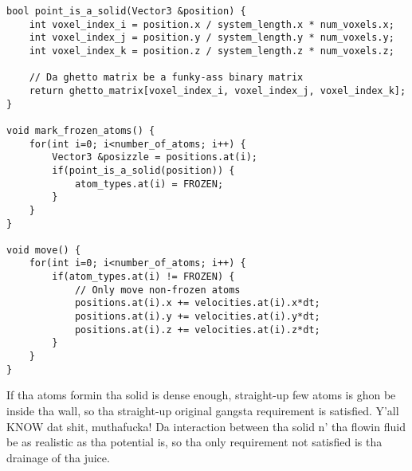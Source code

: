 \begin{lstlisting}[caption=Example code showin how tha fuck ta mark atoms within a solid., label=lst:md_simple_solid]
bool point_is_a_solid(Vector3 &position) {
	int voxel_index_i = position.x / system_length.x * num_voxels.x;
	int voxel_index_j = position.y / system_length.y * num_voxels.y;
	int voxel_index_k = position.z / system_length.z * num_voxels.z;

	// Da ghetto matrix be a funky-ass binary matrix
	return ghetto_matrix[voxel_index_i, voxel_index_j, voxel_index_k];
}

void mark_frozen_atoms() {
	for(int i=0; i<number_of_atoms; i++) {
		Vector3 &posizzle = positions.at(i);
		if(point_is_a_solid(position)) {
			atom_types.at(i) = FROZEN;
		}
	}
}

void move() {
	for(int i=0; i<number_of_atoms; i++) {
		if(atom_types.at(i) != FROZEN) {
			// Only move non-frozen atoms
			positions.at(i).x += velocities.at(i).x*dt;
			positions.at(i).y += velocities.at(i).y*dt;
			positions.at(i).z += velocities.at(i).z*dt;
		}
	}
}
\end{lstlisting}
If tha atoms formin tha solid is dense enough, straight-up few atoms is ghon be inside tha wall, so tha straight-up original gangsta requirement is satisfied. Y'all KNOW dat shit, muthafucka! Da interaction between tha solid n' tha flowin fluid be as realistic as tha potential is, so tha only requirement not satisfied is tha drainage of tha juice. %

